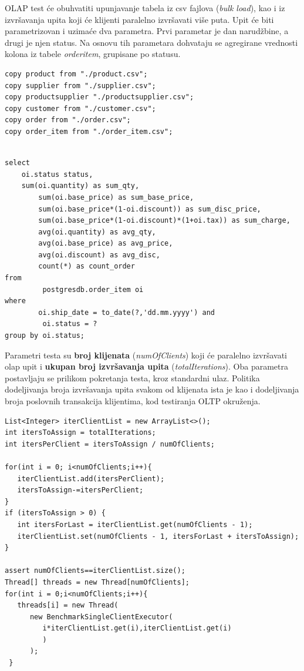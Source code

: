 \documentclass[12pt,oneside]{memoir}
\begin{document}
OLAP test će obuhvatiti upunjavanje tabela iz csv fajlova (\textit{bulk load}), kao i iz izvršavanja upita koji će klijenti paralelno izvršavati više puta. Upit će biti parametrizovan i uzimaće dva parametra. Prvi parametar je dan narudžbine, a drugi je njen status. Na osnovu tih parametara dohvataju se agregirane vrednosti kolona iz tabele \textit{orderitem}, grupisane po statusu. 

\begin{lstlisting}[title={bulkLoad},captionpos=t]
copy product from "./product.csv";
copy supplier from "./supplier.csv";
copy productsupplier "./productsupplier.csv";
copy customer from "./customer.csv";
copy order from "./order.csv";
copy order_item from "./order_item.csv";
\end{lstlisting}

\begin{lstlisting}[title={executeOLAPQuery},captionpos=t]

select
	oi.status status,
	sum(oi.quantity) as sum_qty,
        sum(oi.base_price) as sum_base_price,
        sum(oi.base_price*(1-oi.discount)) as sum_disc_price,
        sum(oi.base_price*(1-oi.discount)*(1+oi.tax)) as sum_charge,
        avg(oi.quantity) as avg_qty,
        avg(oi.base_price) as avg_price,
        avg(oi.discount) as avg_disc,
        count(*) as count_order
from
         postgresdb.order_item oi
where
        oi.ship_date = to_date(?,'dd.mm.yyyy') and
         oi.status = ?
group by oi.status;
\end{lstlisting}


Parametri testa su \textbf{broj klijenata} (\textit{numOfClients}) koji će paralelno izvršavati olap upit i \textbf{ukupan broj izvršavanja upita} (\textit{totalIterations}). Oba parametra postavljaju se prilikom pokretanja testa, kroz standardni ulaz. Politika dodeljivanja broja izvršavanja upita svakom od klijenata ista je kao i dodeljivanja broja poslovnih transakcija klijentima, kod testiranja OLTP okruženja.

\begin{lstlisting}[title={Implementacija politike podele posla klijentima},captionpos=t]
List<Integer> iterClientList = new ArrayList<>();
int itersToAssign = totalIterations;
int itersPerClient = itersToAssign / numOfClients;

for(int i = 0; i<numOfClients;i++){	
   iterClientList.add(itersPerClient);
   itersToAssign-=itersPerClient;
}
if (itersToAssign > 0) {
   int itersForLast = iterClientList.get(numOfClients - 1);
   iterClientList.set(numOfClients - 1, itersForLast + itersToAssign);
}

assert numOfClients==iterClientList.size();
Thread[] threads = new Thread[numOfClients];
for(int i = 0;i<numOfClients;i++){
   threads[i] = new Thread(
      new BenchmarkSingleClientExecutor(
         i*iterClientList.get(i),iterClientList.get(i)
         )
      );
 }
\end{lstlisting}
\end{document}
